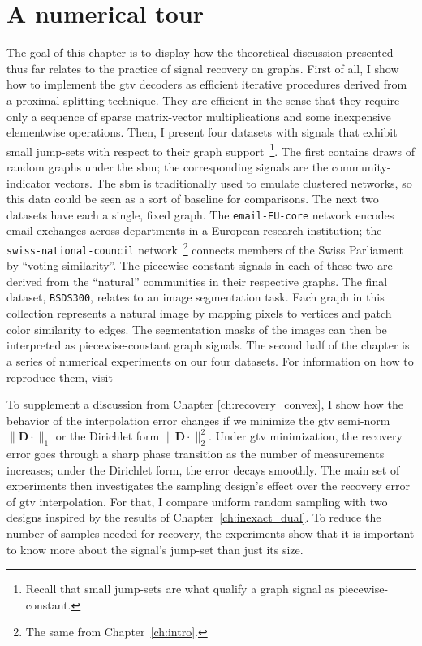 \chapter{A numerical tour}\label{ch:numerical_tour}

The goal of this chapter is to display how the theoretical discussion presented thus far relates to the practice of signal recovery on graphs. First of all, I show how to implement the \acrfull{gtv} decoders as efficient iterative procedures derived from a proximal splitting technique. They are efficient in the sense that they require only a sequence of sparse matrix-vector multiplications and some inexpensive elementwise operations. Then, I present four datasets with signals that exhibit small jump-sets with respect to their graph support~\footnote{Recall that small jump-sets are what qualify a graph signal as piecewise-constant.}. The first contains draws of random graphs under the \acrfull{sbm}; the corresponding signals are the community-indicator vectors. The \acrshort{sbm} is traditionally used to emulate clustered networks, so this data could be seen as a sort of baseline for comparisons. The next two datasets have each a single, fixed graph. The \texttt{email-EU-core} network encodes email exchanges across departments in a European research institution; the \texttt{swiss-national-council} network~\footnote{The same from Chapter~\ref{ch:intro}.} connects members of the Swiss Parliament by ``voting similarity''. The piecewise-constant signals in each of these two are derived from the ``natural'' communities in their respective graphs. The final dataset, \texttt{BSDS300}, relates to an image segmentation task. Each graph in this collection represents a natural image by mapping pixels to vertices and patch color similarity to edges. The segmentation masks of the images can then be interpreted as piecewise-constant graph signals. The second half of the chapter is a series of numerical experiments on our four datasets. For information on how to reproduce them, visit
\begin{center}
\end{center}
To supplement a discussion from Chapter \ref{ch:recovery_convex}, I show how the behavior of the interpolation error changes if we minimize the \acrshort{gtv} semi-norm $\|\mathbf{D} \cdot\|_1$ or the Dirichlet form $\|\mathbf{D} \cdot\|_2^2$. Under \acrshort{gtv} minimization, the recovery error goes through a sharp phase transition as the number of measurements increases; under the Dirichlet form, the error decays smoothly. The main set of experiments then investigates the sampling design's effect over the recovery error of \acrshort{gtv} interpolation. For that, I compare uniform random sampling with two designs inspired by the results of Chapter~\ref{ch:inexact_dual}. To reduce the number of samples needed for recovery, the experiments show that it is important to know more about the signal's jump-set than just its size.


